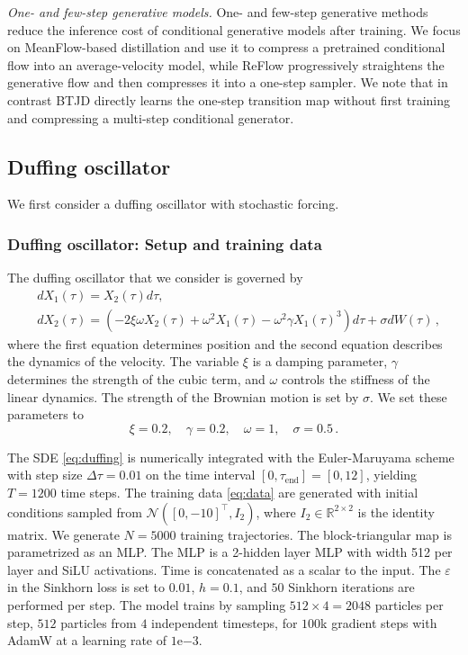\documentclass[oneside,11pt]{article}
\theoremstyle{remark}
\begin{document}
\emph{One- and few-step generative models.}
One- and few-step generative methods reduce the inference cost of conditional generative models after training. We focus on MeanFlow-based distillation
\cite{geng2025mean} and use it to compress a pretrained
conditional flow into an average-velocity model, while ReFlow \cite{liu2023rectified} progressively straightens the generative flow and then compresses it into a one-step sampler. We note that in contrast BTJD directly learns the one-step transition map without first training and compressing a multi-step conditional generator.


\subsection{Duffing oscillator} We first consider a duffing oscillator with stochastic forcing. 
\subsubsection{Duffing oscillator: Setup and training data} The duffing oscillator that we consider is governed by 
    \begin{align}\label{eq:duffing}
        &dX_1(\tau) = X_2(\tau) d\tau, \\
        &dX_2(\tau) = (-2 \xi \omega X_2(\tau) + \omega^2 X_1(\tau) - \omega^2 \gamma X_1(\tau)^3)d\tau + \sigma dW(\tau)\,,
    \end{align}
    where the first equation determines position and the second equation describes the dynamics of the velocity. The variable $\xi$ is a damping parameter, $\gamma$ determines the strength of the cubic term, and $\omega$ controls the stiffness of the linear dynamics. The strength of the Brownian motion is set by $\sigma$. We set these parameters to
    \begin{equation}\label{eq:DuffingHPs}
        \xi = 0.2, \quad \gamma=0.2, \quad \omega = 1, \quad\sigma=0.5\,.
    \end{equation}

The SDE \eqref{eq:duffing} is numerically integrated with the Euler-Maruyama scheme with step size $\Delta \tau = 0.01$ on the time interval $[0,\tau_{\textrm{end}}] = [0,12]$, yielding $T = 1200$ time steps.
The training data \eqref{eq:data} are generated with initial conditions sampled from $\mathcal{N}([0, -10]^{\top}, I_2)$, where $I_2 \in \mathbb{R}^{2 \times 2}$ is the identity matrix. We generate $N = 5000$ training trajectories.
The block-triangular map is parametrized as an MLP. The MLP is a 2-hidden layer MLP with width 512 per layer and SiLU activations. Time is concatenated as a scalar to the input.
The $\varepsilon$ in the Sinkhorn loss is set to $0.01$, $h=0.1$, and $50$ Sinkhorn iterations are performed per step.
The model trains by sampling $512 \times 4=2048$ particles per step, $512$ particles from $4$ independent timesteps, for $100$k gradient steps with AdamW at a learning rate of $1\mathrm{e}{-3}$.
\end{document}
